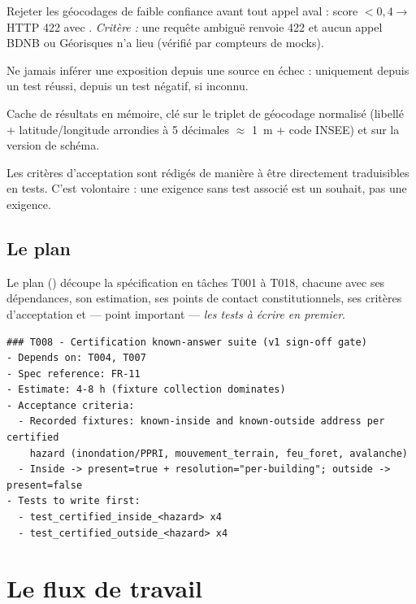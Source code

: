 \begin{description}[leftmargin=0em,style=nextline]
  \item[\frref{03}] Rejeter les géocodages de faible confiance avant tout appel
  aval : score $< 0{,}4 \rightarrow$ HTTP 422  avec
  . \emph{Critère :} une requête ambiguë renvoie 422 et
  aucun appel BDNB ou Géorisques n'a lieu (vérifié par compteurs de mocks).
  \item[\frref{14}] Ne jamais inférer une exposition depuis une source en
  échec :  uniquement depuis un test réussi,
   depuis un test négatif,  si inconnu.
  \item[\frref{26}] Cache de résultats en mémoire, clé sur le triplet de
  géocodage normalisé (libellé + latitude/longitude arrondies à 5 décimales
  $\approx$ 1~m + code INSEE) et sur la version de schéma.
\end{description}

Les critères d'acceptation sont rédigés de manière à être directement
traduisibles en tests. C'est volontaire : une exigence sans test associé est un
souhait, pas une exigence.

\subsection{Le plan}

Le plan () découpe la spécification en tâches
T001 à T018, chacune avec ses dépendances, son estimation, ses points de
contact constitutionnels, ses critères d'acceptation et — point important —
\emph{les tests à écrire en premier}.

\begin{lstlisting}[caption={Extrait du plan : la tâche T008, porte de
certification de la v1.},label={lst:plan-t008}]
### T008 - Certification known-answer suite (v1 sign-off gate)
- Depends on: T004, T007
- Spec reference: FR-11
- Estimate: 4-8 h (fixture collection dominates)
- Acceptance criteria:
  - Recorded fixtures: known-inside and known-outside address per certified
    hazard (inondation/PPRI, mouvement_terrain, feu_foret, avalanche)
  - Inside -> present=true + resolution="per-building"; outside -> present=false
- Tests to write first:
  - test_certified_inside_<hazard> x4
  - test_certified_outside_<hazard> x4
\end{lstlisting}

\section{Le flux de travail}

